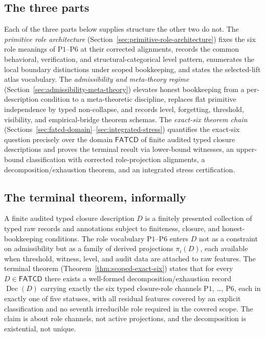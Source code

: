 \documentclass[11pt]{article}
\theoremstyle{definition}
\newcommand{\FATCD}{\ensuremath{\mathsf{FATCD}}}
\newcommand{\Dec}[1]{\ensuremath{\operatorname{Dec}\!\left(#1\right)}}
\newcommand{\Pone}{\ensuremath{\mathrm{P1}}}
\newcommand{\Psix}{\ensuremath{\mathrm{P6}}}
\begin{document}
\subsection{The three parts}\label{subsec:three-pillars}

Each of the three parts below supplies structure the other two do not.
The \emph{primitive role architecture}
(Section~\ref{sec:primitive-role-architecture}) fixes the six role
meanings of \Pone{}--\Psix{} at their corrected alignments, records
the common behavioral, verification, and structural-categorical level
pattern, enumerates the local boundary distinctions under scoped
bookkeeping, and states the selected-lift atlas vocabulary. The
\emph{admissibility and meta-theory regime}
(Section~\ref{sec:admissibility-meta-theory}) elevates honest
bookkeeping from a per-description condition to a meta-theoretic
discipline, replaces flat primitive independence by typed
non-collapse, and records level, forgetting, threshold, visibility,
and empirical-bridge theorem schemas. The \emph{exact-six theorem
chain}
(Sections~\ref{sec:fatcd-domain}--\ref{sec:integrated-stress})
quantifies the exact-six question precisely over the domain \FATCD{}
of finite audited typed closure descriptions and proves the terminal
result via lower-bound witnesses, an upper-bound classification with
corrected role-projection alignments, a decomposition/exhaustion
theorem, and an integrated stress certification.

\subsection{The terminal theorem, informally}\label{subsec:terminal-informal}

A finite audited typed closure description \(D\) is a finitely
presented collection of typed raw records and annotations subject to
finiteness, closure, and honest-bookkeeping conditions. The role
vocabulary \Pone{}--\Psix{} enters \(D\) not as a constraint on
admissibility but as a family of derived projections \(\pi_i(D)\),
each available when threshold, witness, level, and audit data are
attached to raw features. The terminal theorem
(Theorem~\ref{thm:scoped-exact-six}) states that for every
\(D \in \FATCD{}\) there exists a well-formed
decomposition/exhaustion record \(\Dec{D}\) carrying exactly the six
typed closure-role channels \Pone{}, \ldots, \Psix{}, each in exactly
one of five statuses, with all residual features covered by an
explicit classification and no seventh irreducible role required in
the covered scope. The claim is about role channels, not active
projections, and the decomposition is existential, not unique.
\end{document}
